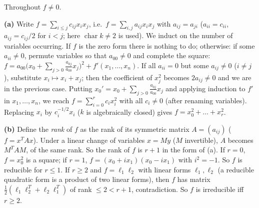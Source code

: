 \documentclass[11pt]{article}
\begin{document}
\pf
Throughout $f\ne0$.

\textbf{(a)} Write $f=\sum_{i\le j}c_{ij}x_ix_j$, i.e.\ $f=\sum_{i,j}a_{ij}x_ix_j$ with $a_{ij}=a_{ji}$ ($a_{ii}=c_{ii}$, $a_{ij}=c_{ij}/2$ for $i<j$; here $\operatorname{char}k\ne2$ is used). We induct on the number of variables occurring. If $f$ is the zero form there is nothing to do; otherwise: if some $a_{ii}\ne0$, permute variables so that $a_{00}\ne0$ and complete the square: $f=a_{00}\bigl(x_0+\sum_{j>0}\tfrac{a_{0j}}{a_{00}}x_j\bigr)^2+f'(x_1,\dots,x_n)$. If all $a_{ii}=0$ but some $a_{ij}\ne0$ ($i\ne j$), substitute $x_i\mapsto x_i+x_j$; then the coefficient of $x_j^2$ becomes $2a_{ij}\ne0$ and we are in the previous case. Putting $x_0'=x_0+\sum_{j>0}\frac{a_{0j}}{a_{00}}x_j$ and applying induction to $f'$ in $x_1,\dots,x_n$, we reach $f=\sum_{i=0}^rc_ix_i^2$ with all $c_i\ne0$ (after renaming variables). Replacing $x_i$ by $c_i^{-1/2}x_i$ ($k$ is algebraically closed) gives $f=x_0^2+\dots+x_r^2$.

\textbf{(b)} Define the \emph{rank} of $f$ as the rank of its symmetric matrix $A=(a_{ij})$ ($f=x^TAx$). Under a linear change of variables $x=My$ ($M$ invertible), $A$ becomes $M^TAM$, of the same rank. So the rank of $f$ is $r+1$ in the form of (a). If $r=0$, $f=x_0^2$ is a square; if $r=1$, $f=(x_0+ix_1)(x_0-ix_1)$ with $i^2=-1$. So $f$ is reducible for $r\le1$. If $r\ge 2$ and $f=\ell_1\ell_2$ with linear forms $\ell_1,\ell_2$ (a reducible quadratic form is a product of two linear forms), then $f$ has matrix $\tfrac12(\ell_1\ell_2^T+\ell_2\ell_1^T)$ of rank $\le2<r+1$, contradiction. So $f$ is irreducible iff $r\ge2$.
\end{document}
